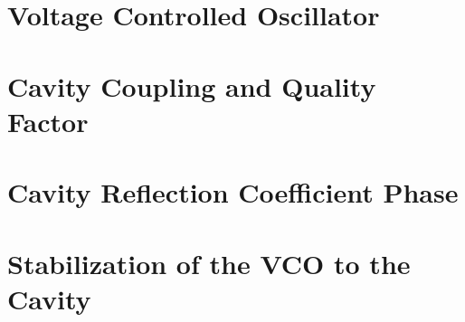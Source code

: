 \documentclass[12pt]{article}
\begin{document}




\section{Voltage Controlled Oscillator}\label{partA}

\newpage
\section{Cavity Coupling and Quality Factor}\label{partB}

\newpage
\section{Cavity Reflection Coefficient Phase}\label{partC}

\newpage
\section{Stabilization of the VCO to the Cavity}\label{partD}

\newpage
\nocite{*}


\end{document}
